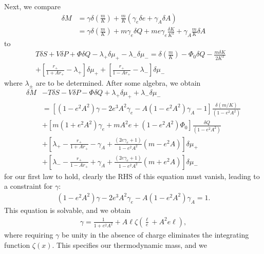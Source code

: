 \documentclass[
twoside,
openright,
frontopenright,
]{dmathesis}
\newcommand{\nn}{\nonumber}
\begin{document}
Next, we compare
\begin{align}
\delta M &= \gamma \delta \left ( \frac{m}{K} \right ) 
+ \frac{m}{K} (\gamma_e \delta e + \gamma_A \delta A)
\nn\\&= \gamma \delta \left ( \frac{m}{K} \right ) 
+ m \gamma_e \delta Q + m e \gamma_e \frac{\delta K}{K^2}
+ \gamma_A \frac{m}{K} \delta A
\end{align}
to
\begin{align}
T \delta S + V \delta P + \Phi \delta Q -\lambda_+ \delta \mu_+ - \lambda_-\delta \mu_-
= \delta \left ( \frac{m}{K} \right ) 
- \Phi_0 \delta Q - \frac{m\delta K}{2K^2}&\nn\\
+ \left [ \frac{r_+}{1+Ar_+} - \lambda _+ \right]\delta \mu_+
+ \left [ \frac{r_+}{1-Ar_+} - \lambda _- \right]\delta \mu_-&
\end{align}
where $\lambda_\pm$ are to be determined. After some
algebra, we obtain
\begin{align}
  \label{eq:firstlawder1}
  \delta M &- T \delta S - V \delta P - \Phi \delta Q + \lambda_+ \delta \mu_+ +
             \lambda_-\delta \mu_-\nn\\
           &= \left [ (1-e^2 A^2) \gamma-2 e^3A^2 \gamma_e -
             A(1-e^2 A^2) \gamma_A -1 \right] \frac{ \delta \left ( {m/K} \right )
             }{(1-e^2A^2)} \nn\\
           &+ \left [ m (1+e^2 A^2) \gamma_e + mA^2 e +(1-e^2 A^2)
             \Phi_0 \right] \frac{ \delta Q }{(1-e^2A^2) }\nn\\
           &+ \left [ \lambda_+ -\frac{r_+}{1+Ar_+} - \gamma_A +
             \frac{(2e\gamma_e+1)}{1-e^2 A^2} \left ( m - e^2A \right) \right]
             \delta \mu_+\nn\\
           &+ \left [ \lambda_- - \frac{r_+}{1-Ar_+} + \gamma_A
             +\frac{(2e\gamma_e+1)}{1-e^2 A^2} \left ( m + e^2A \right) \right]
             \delta \mu_- 
\end{align}
for our first law to hold, clearly the RHS of this equation must vanish, leading
to a constraint for $\gamma$:
\begin{align}
(1-e^2 A^2) \gamma-2 e^3A^2 \gamma_e - A(1-e^2 A^2) \gamma_A =1.
\end{align}
This equation is solvable, and we obtain
\begin{align}
  \gamma = \frac{1}{1+e^2 A^2} + A\ell \zeta\left(\frac{\ell}{e}+A^2e \ell\right),
\end{align}
where requiring $\gamma$ be unity in the absence of charge eliminates the
integrating function $\zeta(x)$. This specifies our thermodynamic mass, and we
\end{document}
